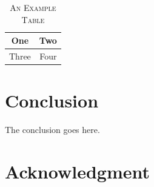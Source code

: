 \documentclass[conference, a4paper]{IEEEtran}
\begin{document}
%
\begin{table}[ph]
\renewcommand{\arraystretch}{1.3}
\caption{\textsc{An Example Table}}
\label{table_example}
\centering
\begin{tabular}{|c||c|}
\hline
One & Two\\
\hline
Three & Four\\
\hline
\end{tabular}
\end{table}






\section{Conclusion}
The conclusion goes here.






\section*{Acknowledgment}
\end{document}
